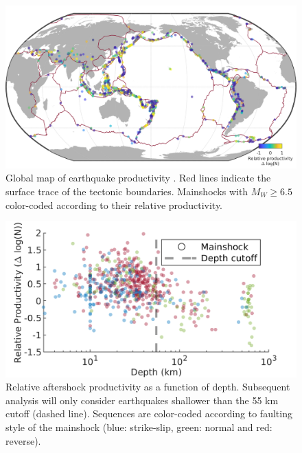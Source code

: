 \documentclass[draft]{agujournal}
\begin{document}
\begin{figure}[H]
\includegraphics[width=\linewidth]{figures/worldmap_res_mw5.png}
\caption{Global map of earthquake productivity . Red lines indicate the surface trace of the tectonic boundaries. Mainshocks with $M_W\ge6.5$ color-coded according to their relative productivity.
} 
\label{fig:global_res}
\end{figure}

\begin{figure}[H]
\centering
\includegraphics{figures/prod_vs_depth_mw5.png}
\caption{Relative aftershock productivity  as a function of depth. Subsequent analysis will only consider earthquakes shallower than the 55 km cutoff (dashed line). Sequences are color-coded according to faulting style of the mainshock (blue: strike-slip, green: normal and red: reverse).}
\label{fig:prod_vs_depth}
\end{figure}
\end{document}
